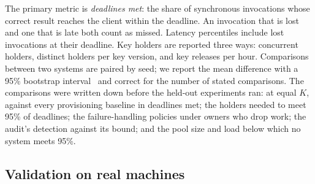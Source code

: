 The primary metric is \emph{deadlines met}: the share of synchronous invocations whose correct result reaches the
client within the deadline. An invocation that is lost and one that is late both count as missed. Latency percentiles
include lost invocations at their deadline. Key holders are reported three ways: concurrent holders, distinct holders
per key version, and key releases per hour. Comparisons between two systems are paired by seed; we report the mean
difference with a 95\% bootstrap interval~\cite{efron1993bootstrap} and correct for the number of stated
comparisons. The comparisons were written down before the held-out experiments ran: at equal $K$, \voss{} against
every provisioning baseline in deadlines met; the holders needed to meet 95\% of deadlines; the failure-handling
policies under owners who drop work; the audit's detection against its bound; and the pool size and load below which
no system meets 95\%.

\subsection{Validation on real machines}
\label{sec:validation}

